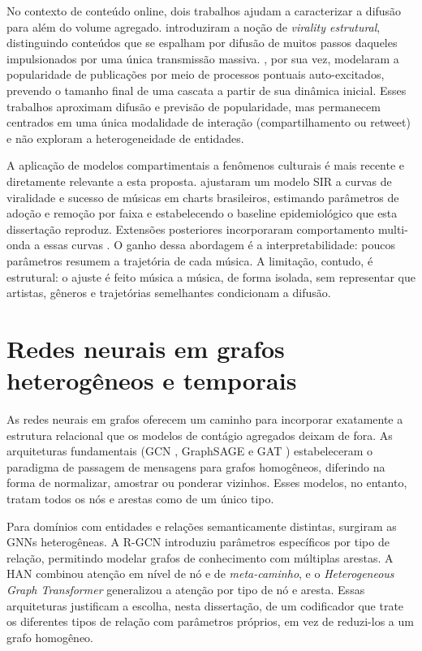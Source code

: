 No contexto de conteúdo online, dois trabalhos ajudam a caracterizar a difusão para além do volume agregado. \citet{goel2016virality} introduziram a noção de \emph{virality estrutural}, distinguindo conteúdos que se espalham por difusão de muitos passos daqueles impulsionados por uma única transmissão massiva. \citet{zhao2015seismic}, por sua vez, modelaram a popularidade de publicações por meio de processos pontuais auto-excitados, prevendo o tamanho final de uma cascata a partir de sua dinâmica inicial. Esses trabalhos aproximam difusão e previsão de popularidade, mas permanecem centrados em uma única modalidade de interação (compartilhamento ou retweet) e não exploram a heterogeneidade de entidades.

A aplicação de modelos compartimentais a fenômenos culturais é mais recente e diretamente relevante a esta proposta. \citet{oliveira2025brasnam} ajustaram um modelo SIR a curvas de viralidade e sucesso de músicas em charts brasileiros, estimando parâmetros de adoção e remoção por faixa e estabelecendo o baseline epidemiológico que esta dissertação reproduz. Extensões posteriores incorporaram comportamento multi-onda a essas curvas \citep{oliveira2025asonam}. O ganho dessa abordagem é a interpretabilidade: poucos parâmetros resumem a trajetória de cada música. A limitação, contudo, é estrutural: o ajuste é feito música a música, de forma isolada, sem representar que artistas, gêneros e trajetórias semelhantes condicionam a difusão.


\section{Redes neurais em grafos heterogêneos e temporais}

As redes neurais em grafos oferecem um caminho para incorporar exatamente a estrutura relacional que os modelos de contágio agregados deixam de fora. As arquiteturas fundamentais (GCN \citep{kipf2017gcn}, GraphSAGE \citep{hamilton2017graphsage} e GAT \citep{velickovic2018gat}) estabeleceram o paradigma de passagem de mensagens para grafos homogêneos, diferindo na forma de normalizar, amostrar ou ponderar vizinhos. Esses modelos, no entanto, tratam todos os nós e arestas como de um único tipo.

Para domínios com entidades e relações semanticamente distintas, surgiram as GNNs heterogêneas. A R-GCN \citep{schlichtkrull2018rgcn} introduziu parâmetros específicos por tipo de relação, permitindo modelar grafos de conhecimento com múltiplas arestas. A HAN \citep{wang2019han} combinou atenção em nível de nó e de \emph{meta-caminho}, e o \emph{Heterogeneous Graph Transformer} \citep{hu2020hgt} generalizou a atenção por tipo de nó e aresta. Essas arquiteturas justificam a escolha, nesta dissertação, de um codificador que trate os diferentes tipos de relação com parâmetros próprios, em vez de reduzi-los a um grafo homogêneo.

